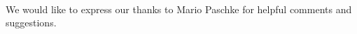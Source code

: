 \documentclass[12pt]{article}
\begin{document}


















\vspace{1cm}
\\
We would like to express our thanks to Mario Paschke for helpful comments and suggestions.\\
\end{document}
